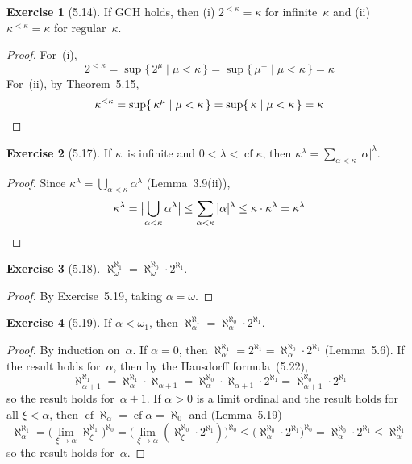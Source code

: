 \documentclass[letterpaper,12pt]{article}
\newcommand{\al}{\aleph}
\newcommand{\alo}{\al_{\omega}}
\newcommand{\bigunion}{\bigcup}
\newcommand{\mult}{\cdot}
\DeclareMathOperator{\cf}{cf}
\newcommand{\csuc}[1]{#1^+}
\newcommand{\card}[1]{|#1|}
\newcommand{\bigcard}[1]{\bigl|#1\bigr|}
\theoremstyle{definition}
\newtheorem*{exer}{Exercise}
\theoremstyle{remark}
\begin{document}
\begin{exer}[5.14]
If GCH holds, then (i) \(2^{<\kappa}=\kappa\) for infinite~\(\kappa\) and (ii) \(\kappa^{<\kappa}=\kappa\) for regular~\(\kappa\).
\end{exer}
\begin{proof}
For~(i),
\[2^{<\kappa}=\sup\{\,2^\mu\mid\mu<\kappa\,\}=\sup\{\,\csuc{\mu}\mid\mu<\kappa\,\}=\kappa\]
For~(ii), by Theorem~5.15,
\[\kappa^{<\kappa}=\sup\{\,\kappa^\mu\mid\mu<\kappa\,\}=\sup\{\,\kappa\mid\mu<\kappa\,\}=\kappa\qedhere\]
\end{proof}

\begin{exer}[5.17]
If \(\kappa\)~is infinite and \(0<\lambda<\cf\kappa\), then \(\kappa^{\lambda}=\sum_{\alpha<\kappa}\card{\alpha}^{\lambda}\).
\end{exer}
\begin{proof}
Since \(\kappa^{\lambda}=\bigunion_{\alpha<\kappa}\alpha^{\lambda}\) (Lemma~3.9(ii)),
\[\kappa^{\lambda}=\bigcard{\bigunion_{\alpha<\kappa}\alpha^{\lambda}}\le\sum_{\alpha<\kappa}\card{\alpha}^{\lambda}\le\kappa\mult\kappa^{\lambda}=\kappa^{\lambda}\qedhere\]
\end{proof}

\begin{exer}[5.18]
\(\alo^{\al_1}=\alo^{\al_0}\mult 2^{\al_1}\).
\end{exer}
\begin{proof}
By Exercise~5.19, taking \(\alpha=\omega\).
\end{proof}

\begin{exer}[5.19]
If \(\alpha<\omega_1\), then \(\al_{\alpha}^{\al_1}=\al_{\alpha}^{\al_0}\mult 2^{\al_1}\).
\end{exer}
\begin{proof}
By induction on~\(\alpha\). If \(\alpha=0\), then \(\al_{\alpha}^{\al_1}=2^{\al_1}=\al_{\alpha}^{\al_0}\mult 2^{\al_1}\) (Lemma~5.6). If the result holds for~\(\alpha\), then by the Hausdorff formula~(5.22),
\[\al_{\alpha+1}^{\al_1}=\al_{\alpha}^{\al_1}\mult\al_{\alpha+1}=\al_{\alpha}^{\al_0}\mult\al_{\alpha+1}\mult 2^{\al_1}=\al_{\alpha+1}^{\al_0}\mult 2^{\al_1}\]
so the result holds for~\(\alpha+1\). If \(\alpha>0\) is a limit ordinal and the result holds for all \(\xi<\alpha\), then \(\cf\al_{\alpha}=\cf\alpha=\al_0\) and (Lemma~5.19)
\[\al_{\alpha}^{\al_1}=\bigl(\lim_{\xi\to\alpha}\al_{\xi}^{\al_1}\bigr)^{\al_0}=\bigl(\lim_{\xi\to\alpha}(\al_{\xi}^{\al_0}\mult 2^{\al_1})\bigr)^{\al_0}\le\bigl(\al_{\alpha}^{\al_0}\mult 2^{\al_1}\bigr)^{\al_0}=\al_{\alpha}^{\al_0}\mult 2^{\al_1}\le\al_{\alpha}^{\al_1}\]
so the result holds for~\(\alpha\).
\end{proof}
\end{document}
